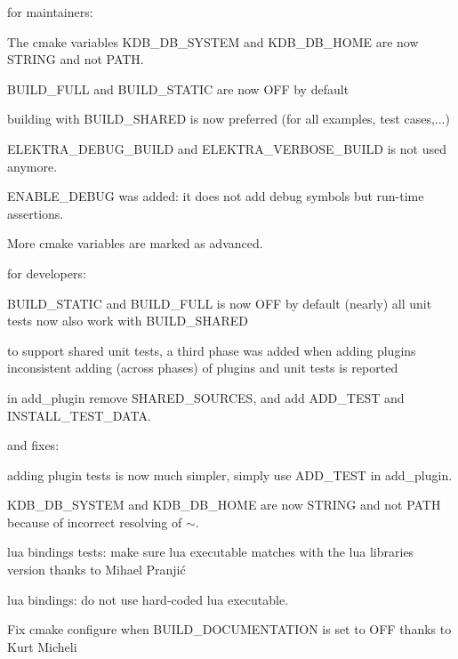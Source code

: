 for maintainers\+:


\begin{DoxyItemize}
\item The cmake variables K\+D\+B\+\_\+\+D\+B\+\_\+\+S\+Y\+S\+T\+EM and K\+D\+B\+\_\+\+D\+B\+\_\+\+H\+O\+ME are now S\+T\+R\+I\+NG and not P\+A\+TH.
\item B\+U\+I\+L\+D\+\_\+\+F\+U\+LL and B\+U\+I\+L\+D\+\_\+\+S\+T\+A\+T\+IC are now O\+FF by default
\item building with B\+U\+I\+L\+D\+\_\+\+S\+H\+A\+R\+ED is now preferred (for all examples, test cases,...)
\item E\+L\+E\+K\+T\+R\+A\+\_\+\+D\+E\+B\+U\+G\+\_\+\+B\+U\+I\+LD and E\+L\+E\+K\+T\+R\+A\+\_\+\+V\+E\+R\+B\+O\+S\+E\+\_\+\+B\+U\+I\+LD is not used anymore.
\item E\+N\+A\+B\+L\+E\+\_\+\+D\+E\+B\+UG was added\+: it does not add debug symbols but run-\/time assertions.
\item More cmake variables are marked as advanced.
\end{DoxyItemize}

for developers\+:


\begin{DoxyItemize}
\item B\+U\+I\+L\+D\+\_\+\+S\+T\+A\+T\+IC and B\+U\+I\+L\+D\+\_\+\+F\+U\+LL is now O\+FF by default (nearly) all unit tests now also work with B\+U\+I\+L\+D\+\_\+\+S\+H\+A\+R\+ED
\item to support shared unit tests, a third phase was added when adding plugins inconsistent adding (across phases) of plugins and unit tests is reported
\item in {\ttfamily add\+\_\+plugin} remove S\+H\+A\+R\+E\+D\+\_\+\+S\+O\+U\+R\+C\+ES, and add {\ttfamily A\+D\+D\+\_\+\+T\+E\+ST} and {\ttfamily I\+N\+S\+T\+A\+L\+L\+\_\+\+T\+E\+S\+T\+\_\+\+D\+A\+TA}.
\end{DoxyItemize}

and fixes\+:


\begin{DoxyItemize}
\item adding plugin tests is now much simpler, simply use {\ttfamily A\+D\+D\+\_\+\+T\+E\+ST} in {\ttfamily add\+\_\+plugin}.
\item K\+D\+B\+\_\+\+D\+B\+\_\+\+S\+Y\+S\+T\+EM and K\+D\+B\+\_\+\+D\+B\+\_\+\+H\+O\+ME are now S\+T\+R\+I\+NG and not P\+A\+TH because of incorrect resolving of {\ttfamily $\sim$}.
\item lua bindings tests\+: make sure lua executable matches with the lua libraries version thanks to Mihael Pranjić
\item lua bindings\+: do not use hard-\/coded {\ttfamily lua} executable.
\item Fix cmake configure when B\+U\+I\+L\+D\+\_\+\+D\+O\+C\+U\+M\+E\+N\+T\+A\+T\+I\+ON is set to O\+FF thanks to Kurt Micheli
\end{DoxyItemize}

